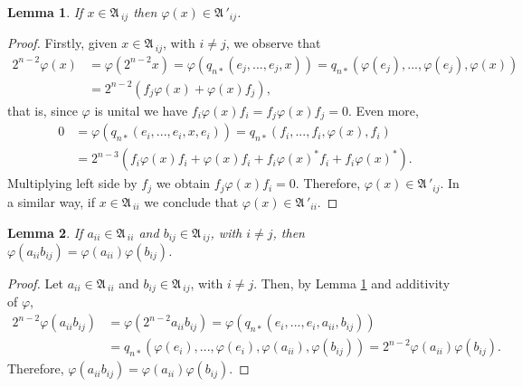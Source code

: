 \documentclass{amsart}
\newtheorem{lemma}{Lemma}[section]
\def\A{{\mathfrak A}\, }
\begin{document}
\begin{lemma}\label{lemam1}
If $x \in \A_{ij}$ then $\varphi(x) \in \A'_{ij}$.
\end{lemma}
\begin{proof}
Firstly, given $x \in \A_{ij}$, with $i \neq j$, we observe that
$$
\begin{aligned}
2^{n-2}\varphi(x) &= \varphi(2^{n-2}x) = \varphi(q_{n*}(e_j,...,e_j,x)) = q_{n*}(\varphi(e_j),...,\varphi(e_j),\varphi(x)) \\
                  &= 2^{n-2}(f_j\varphi(x) + \varphi(x)f_j),
\end{aligned}
$$
that is,  since $\varphi$ is unital we have $f_i\varphi(x)f_i = f_j\varphi(x)f_j = 0$.
Even more,
$$
\begin{aligned}
0 &= \varphi(q_{n*}(e_i,...,e_i,x,e_i)) = q_{n*}(f_i,...,f_i,\varphi(x),f_i) \\
  &= 2^{n-3}(f_i\varphi(x)f_i + \varphi(x)f_i + f_i\varphi(x)^*f_i + f_i\varphi(x)^*).
\end{aligned}
$$
Multiplying left side by $f_j$ we obtain $f_j\varphi(x)f_i = 0$. Therefore, $\varphi(x) \in \A'_{ij}$. 
In a similar way, if $x \in \A_{ii}$ we conclude that $\varphi(x) \in \A'_{ii}$.
\end{proof}

\begin{lemma}\label{lemam2}
If $a_{ii} \in \A_{ii}$ and $b_{ij} \in \A_{ij}$, with $i \neq j$, then $\varphi(a_{ii}b_{ij})=\varphi(a_{ii})\varphi(b_{ij})$.
\end{lemma}
\begin{proof}
Let $a_{ii} \in \A_{ii}$ and $b_{ij} \in \A_{ij}$, with $i \neq j$. Then, by Lemma \ref{lemam1} and additivity of $\varphi$,
$$
\begin{aligned}
2^{n-2}\varphi(a_{ii}b_{ij}) &= \varphi(2^{n-2}a_{ii}b_{ij}) = \varphi(q_{n*}(e_i,...,e_i,a_{ii},b_{ij})) \\
            &= q_{n*}(\varphi(e_i),...,\varphi(e_i),\varphi(a_{ii}),\varphi(b_{ij})) = 2^{n-2}\varphi(a_{ii})\varphi(b_{ij}).
\end{aligned}
$$
Therefore, $
\varphi(a_{ii}b_{ij}) = \varphi(a_{ii})\varphi(b_{ij}).$
\end{proof}
\end{document}
